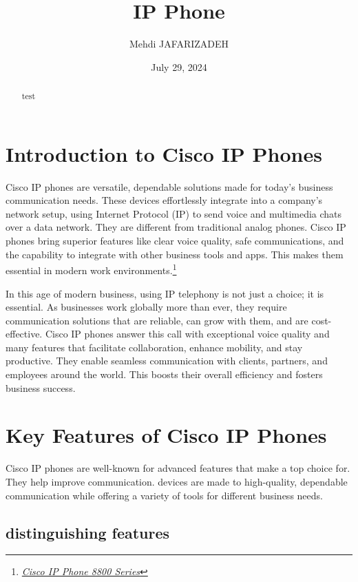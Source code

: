 \documentclass[11pt,a4paper]{article}
\title{IP Phone}
\author{Mehdi JAFARIZADEH}
\date{July 29, 2024}
\begin{document}
\maketitle

\begin{abstract}
    test
\end{abstract}
\section*{Introduction to Cisco IP Phones}
Cisco IP phones are versatile, dependable solutions made for today’s business communication needs. These devices effortlessly integrate into a company’s network setup, using Internet Protocol (IP) to send voice and multimedia chats over a data network. They are different from traditional analog phones. Cisco IP phones bring superior features like clear voice quality, safe communications, and the capability to integrate with other business tools and apps. This makes them essential in modern work environments.\footnote{\label{foot:Cisco IP Phone 8800}\href{https://www.cisco.com/c/en/us/products/collaboration-endpoints/unified-ip-phone-8800-series/index.html}{\textit{Cisco IP Phone 8800 Series}}}

In this age of modern business, using IP telephony is not just a choice; it is essential. As businesses work globally more than ever, they require communication solutions that are reliable, can grow with them, and are cost-effective. Cisco IP phones answer this call with exceptional voice quality and many features that facilitate collaboration, enhance mobility, and stay productive. They enable seamless communication with clients, partners, and employees around the world. This boosts their overall efficiency and fosters business success.

\section*{Key Features of Cisco IP Phones}

Cisco IP phones are well-known for advanced features that make a top choice for. They help improve communication. devices are made to high-quality, dependable communication while offering a variety of tools for different business needs.

\subsection*{distinguishing features}
\end{document}

